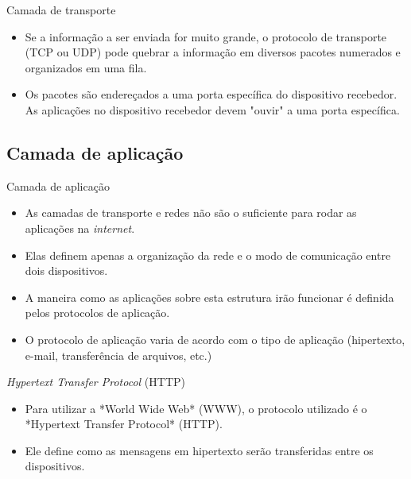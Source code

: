 \documentclass[11pt]{beamer}
\begin{document}
    \begin{frame}{Camada de transporte}
      \begin{itemize}
        \item Se a informação a ser enviada for muito grande, o protocolo de transporte (TCP ou UDP) pode quebrar a informação em diversos pacotes numerados e organizados em uma fila.
        \item Os pacotes são endereçados a uma porta específica do dispositivo recebedor. As aplicações no dispositivo recebedor devem "ouvir" a uma porta específica.
      \end{itemize}
    \end{frame}

    \subsection{Camada de aplicação}

    \begin{frame}{Camada de aplicação}
      \begin{itemize}
        \item As camadas de transporte e redes não são o suficiente para rodar as aplicações na \textit{internet}.
        \item Elas definem apenas a organização da rede e o modo de comunicação entre dois dispositivos.
        \item A maneira como as aplicações sobre esta estrutura irão funcionar é definida pelos protocolos de aplicação.
        \item O protocolo de aplicação varia de acordo com o tipo de aplicação (hipertexto, e-mail, transferência de arquivos, etc.)
      \end{itemize}
    \end{frame}

    \begin{frame}{\textit{Hypertext Transfer Protocol} (HTTP)}
      \begin{itemize}
        \item Para utilizar a *World Wide Web* (WWW), o protocolo utilizado é o *Hypertext Transfer Protocol* (HTTP).
        \item Ele define como as mensagens em hipertexto serão transferidas entre os dispositivos.
      \end{itemize}
    \end{frame}
\end{document}
